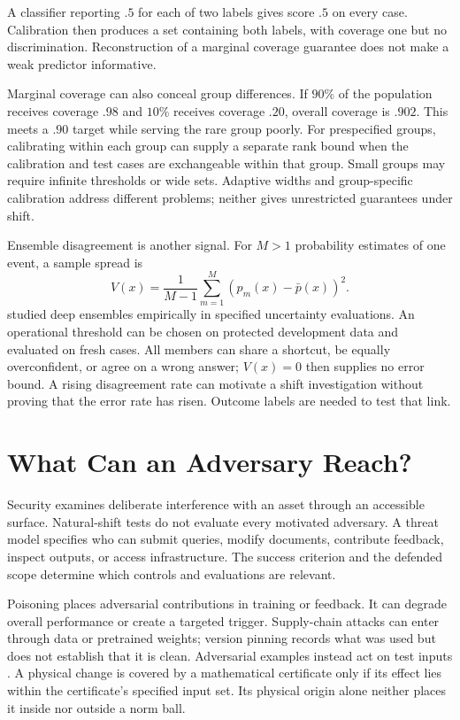 A classifier reporting $.5$ for each of two labels gives score $.5$ on every case. Calibration then produces a set containing both labels, with coverage one but no discrimination. Reconstruction of a marginal coverage guarantee does not make a weak predictor informative.

Marginal coverage can also conceal group differences. If $90\%$ of the population receives coverage $.98$ and $10\%$ receives coverage $.20$, overall coverage is $.902$. This meets a $.90$ target while serving the rare group poorly. For prespecified groups, calibrating within each group can supply a separate rank bound when the calibration and test cases are exchangeable within that group. Small groups may require infinite thresholds or wide sets. Adaptive widths and group-specific calibration address different problems; neither gives unrestricted guarantees under shift.

Ensemble disagreement is another signal. For $M>1$ probability estimates of one event, a sample spread is
\[
V(x)=\frac1{M-1}\sum_{m=1}^M(p_m(x)-\bar p(x))^2.
\]
\citet{lakshminarayanan2017ensembles} studied deep ensembles empirically in specified uncertainty evaluations. An operational threshold can be chosen on protected development data and evaluated on fresh cases. All members can share a shortcut, be equally overconfident, or agree on a wrong answer; $V(x)=0$ then supplies no error bound. A rising disagreement rate can motivate a shift investigation without proving that the error rate has risen. Outcome labels are needed to test that link.

\section{What Can an Adversary Reach?}
\label{sec:security-reliability}

Security examines deliberate interference with an asset through an accessible surface. Natural-shift tests do not evaluate every motivated adversary. A threat model specifies who can submit queries, modify documents, contribute feedback, inspect outputs, or access infrastructure. The success criterion and the defended scope determine which controls and evaluations are relevant.

Poisoning places adversarial contributions in training or feedback. It can degrade overall performance or create a targeted trigger. Supply-chain attacks can enter through data or pretrained weights; version pinning records what was used but does not establish that it is clean. Adversarial examples instead act on test inputs \citep{szegedy2014,goodfellow2015}. A physical change is covered by a mathematical certificate only if its effect lies within the certificate's specified input set. Its physical origin alone neither places it inside nor outside a norm ball.

